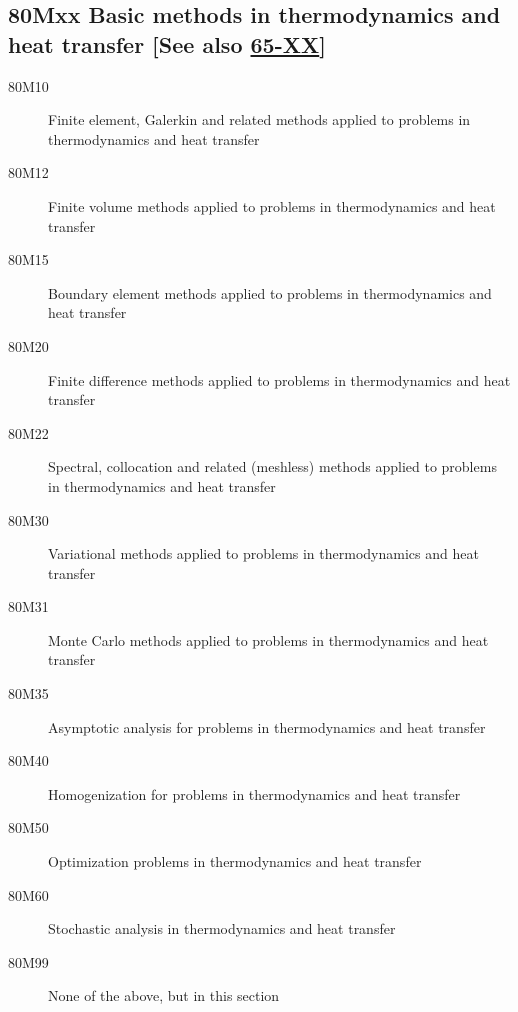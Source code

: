 \subsection*{80Mxx  Basic methods in thermodynamics and heat transfer [See also \hyperref[65-XX]{65-XX}] }\label{80Mxx}
\begin{description}  
\item [80M10]\label{80M10} Finite element, Galerkin and related methods applied to problems in thermodynamics and heat transfer
\item [80M12]\label{80M12} Finite volume methods applied to problems in thermodynamics and heat transfer
\item [80M15]\label{80M15} Boundary element methods applied to problems in thermodynamics and heat transfer
\item [80M20]\label{80M20} Finite difference methods applied to problems in thermodynamics and heat transfer
\item [80M22]\label{80M22} Spectral, collocation and related (meshless) methods applied to problems in thermodynamics and heat transfer
\item [80M30]\label{80M30} Variational methods applied to problems in thermodynamics and heat transfer
\item [80M31]\label{80M31} Monte Carlo methods applied to problems in thermodynamics and heat transfer
\item [80M35]\label{80M35} Asymptotic analysis for problems in thermodynamics and heat transfer
\item [80M40]\label{80M40} Homogenization for problems in thermodynamics and heat transfer
\item [80M50]\label{80M50} Optimization problems in thermodynamics and heat transfer
\item [80M60]\label{80M60} Stochastic analysis in thermodynamics and heat transfer
\item [80M99]\label{80M99} None of the above, but in this section
\end{description}
